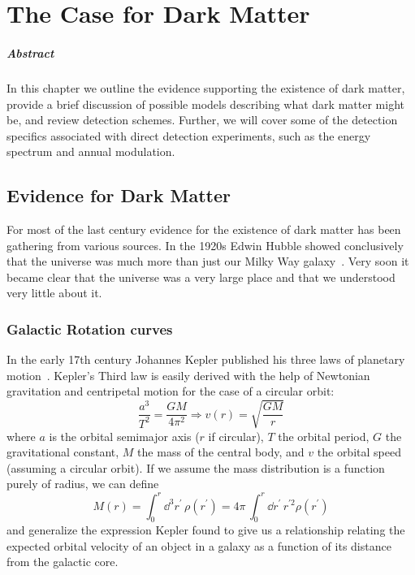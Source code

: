 
\chapter{The Case for Dark Matter}

\paragraph{Abstract} In this chapter we outline the evidence supporting the existence of dark matter, provide a brief discussion of possible models describing what dark matter might be, and review detection schemes. Further, we will cover some of the detection specifics associated with direct detection experiments, such as the energy spectrum and annual modulation.

\section{Evidence for Dark Matter}

For most of the last century evidence for the existence of dark matter has been gathering from various sources. In the 1920s Edwin Hubble showed conclusively that the universe was much more than just our Milky Way galaxy~\cite{Hubble:1929}. Very soon it became clear that the universe was a very large place and that we understood very little about it.

\subsection{Galactic Rotation curves}

In the early 17th century Johannes Kepler published his three laws of planetary motion~\cite{Kepler}. Kepler's Third law is easily derived with the help of Newtonian gravitation and centripetal motion for the case of a circular orbit:
\begin{equation} \label{eq:rotation_curve}
\frac{a^3}{T^2} = \frac{GM}{4\pi^2} \Longrightarrow v(r) = \sqrt{\frac{GM}{r}}
\end{equation}
where $a$ is the orbital semimajor axis ($r$ if circular), $T$ the orbital period, $G$ the gravitational constant, $M$ the mass of the central body, and $v$ the orbital speed (assuming a circular orbit). If we assume the mass distribution is a function purely of radius, we can define
\begin{equation} \label{eq:mass_distribution}
M(r) = \int_0^r \dd^3r^{\prime}\, \rho (r^{\prime}) = 4\pi\,\int_0^r \dd r^{\prime}\, r^{\prime 2} \rho(r^{\prime})
\end{equation}
and generalize the expression Kepler found to give us a relationship relating the expected orbital velocity of an object in a galaxy as a function of its distance from the galactic core.

